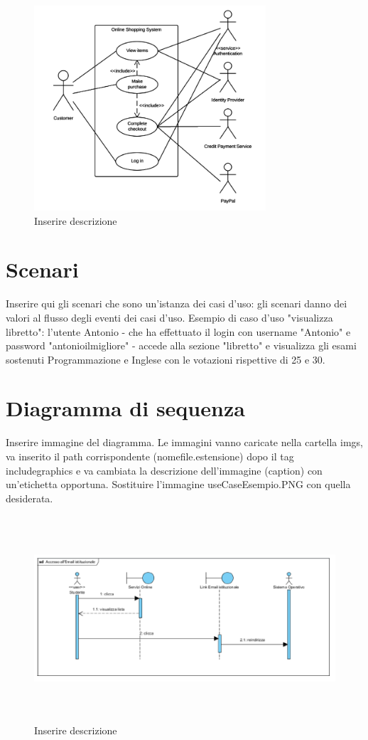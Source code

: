 \begin{figure}[H]
	\centering
	\includegraphics[height=3in]{imgs/useCaseEsempio.PNG}
	\caption{Inserire descrizione}
	\label{fig:prova}
\end{figure}

\section{Scenari}
Inserire qui gli scenari che sono un'istanza dei casi d'uso: gli scenari danno dei valori al flusso degli eventi dei casi d'uso. Esempio di caso d'uso "visualizza libretto": l'utente Antonio - che ha effettuato il login con username "Antonio" e password "antonioilmigliore" - accede alla sezione "libretto" e visualizza gli esami sostenuti Programmazione e Inglese con le votazioni rispettive di 25 e 30.

\section{Diagramma di sequenza}

Inserire immagine del diagramma. Le immagini vanno caricate nella cartella imgs, va inserito il path corrispondente (nomefile.estensione) dopo il tag includegraphics e va cambiata la descrizione dell'immagine (caption) con un'etichetta opportuna. Sostituire l'immagine useCaseEsempio.PNG con quella desiderata.

\begin{figure}[H]
	\centering
	\includegraphics[height=3in,width=5in]{imgs/SequenceDgEsempio.PNG}
	\caption{Inserire descrizione}
	\label{fig:prova}
\end{figure}

